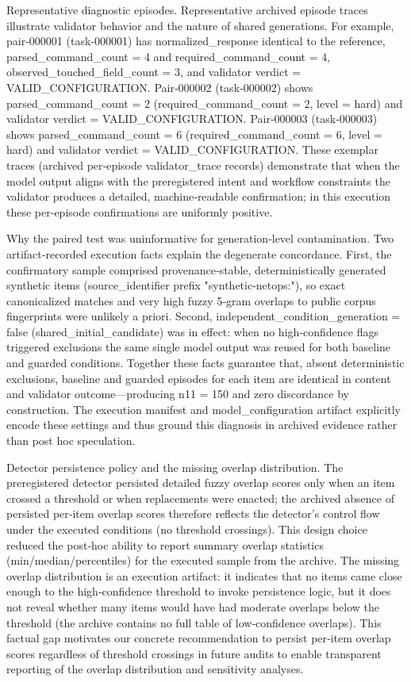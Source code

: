 \documentclass[conference]{IEEEtran}
\begin{document}
Representative diagnostic episodes. Representative archived episode traces illustrate validator behavior and the nature of shared generations. For example, pair‑000001 (task‑000001) has normalized\_response identical to the reference, parsed\_command\_count = 4 and required\_command\_count = 4, observed\_touched\_field\_count = 3, and validator verdict = VALID\_CONFIGURATION. Pair‑000002 (task‑000002) shows parsed\_command\_count = 2 (required\_command\_count = 2, level = hard) and validator verdict = VALID\_CONFIGURATION. Pair‑000003 (task‑000003) shows parsed\_command\_count = 6 (required\_command\_count = 6, level = hard) and validator verdict = VALID\_CONFIGURATION. These exemplar traces (archived per‑episode validator\_trace records) demonstrate that when the model output aligns with the preregistered intent and workflow constraints the validator produces a detailed, machine‑readable confirmation; in this execution these per‑episode confirmations are uniformly positive.

Why the paired test was uninformative for generation‑level contamination. Two artifact‑recorded execution facts explain the degenerate concordance. First, the confirmatory sample comprised provenance‑stable, deterministically generated synthetic items (source\_identifier prefix "synthetic-netops:"), so exact canonicalized matches and very high fuzzy 5‑gram overlaps to public corpus fingerprints were unlikely a priori. Second, independent\_condition\_generation = false (shared\_initial\_candidate) was in effect: when no high‑confidence flags triggered exclusions the same single model output was reused for both baseline and guarded conditions. Together these facts guarantee that, absent deterministic exclusions, baseline and guarded episodes for each item are identical in content and validator outcome---producing n11 = 150 and zero discordance by construction. The execution manifest and model\_configuration artifact explicitly encode these settings and thus ground this diagnosis in archived evidence rather than post hoc speculation.

Detector persistence policy and the missing overlap distribution. The preregistered detector persisted detailed fuzzy overlap scores only when an item crossed a threshold or when replacements were enacted; the archived absence of persisted per‑item overlap scores therefore reflects the detector's control flow under the executed conditions (no threshold crossings). This design choice reduced the post‑hoc ability to report summary overlap statistics (min/median/percentiles) for the executed sample from the archive. The missing overlap distribution is an execution artifact: it indicates that no items came close enough to the high‑confidence threshold to invoke persistence logic, but it does not reveal whether many items would have had moderate overlaps below the threshold (the archive contains no full table of low‑confidence overlaps). This factual gap motivates our concrete recommendation to persist per‑item overlap scores regardless of threshold crossings in future audits to enable transparent reporting of the overlap distribution and sensitivity analyses.
\end{document}
